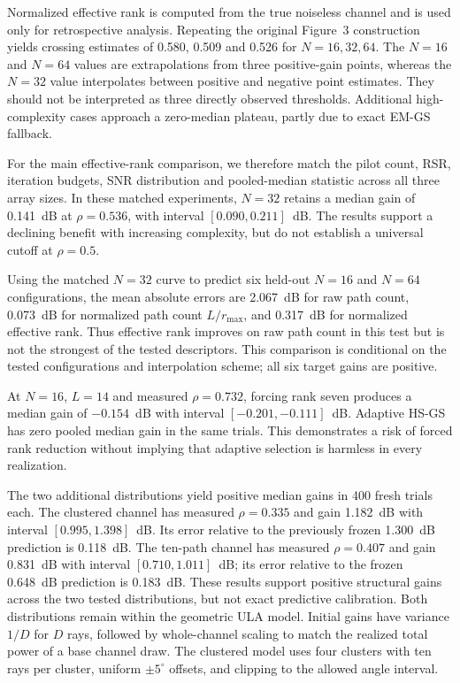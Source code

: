 Normalized effective rank is computed from the true noiseless channel and
is used only for retrospective analysis. Repeating the original Figure~3
construction yields crossing estimates of 0.580, 0.509 and 0.526 for
$N=16,32,64$. The $N=16$ and $N=64$ values are extrapolations from three
positive-gain points, whereas the $N=32$ value interpolates between
positive and negative point estimates. They should not be interpreted as
three directly observed thresholds. Additional high-complexity cases
approach a zero-median plateau, partly due to exact EM-GS fallback.

For the main effective-rank comparison, we therefore match the pilot count,
RSR, iteration budgets, SNR distribution and pooled-median statistic across
all three array sizes. In these matched experiments, $N=32$ retains a
median gain of 0.141~dB at $\rho=0.536$, with interval $[0.090,0.211]$~dB.
The results support a declining benefit with increasing complexity, but
do not establish a universal cutoff at $\rho=0.5$.

Using the matched $N=32$ curve to predict six held-out $N=16$ and $N=64$
configurations, the mean absolute errors are 2.067~dB for raw path count,
0.073~dB for normalized path count $L/r_{\max}$, and 0.317~dB for
normalized effective rank. Thus effective rank improves on raw path count
in this test but is not the strongest of the tested descriptors. This
comparison is conditional on the tested configurations and interpolation
scheme; all six target gains are positive.

At $N=16$, $L=14$ and measured $\rho=0.732$, forcing rank seven produces
a median gain of $-0.154$~dB with interval $[-0.201,-0.111]$~dB.
Adaptive HS-GS has zero pooled median gain in the same trials. This
demonstrates a risk of forced rank reduction without implying that
adaptive selection is harmless in every realization.

The two additional distributions yield positive median gains in 400 fresh
trials each. The clustered channel has measured $\rho=0.335$ and gain
1.182~dB with interval $[0.995,1.398]$~dB. Its error relative to the
previously frozen 1.300~dB prediction is 0.118~dB. The ten-path channel
has measured $\rho=0.407$ and gain 0.831~dB with interval
$[0.710,1.011]$~dB; its error relative to the frozen 0.648~dB prediction
is 0.183~dB. These results support positive structural gains across the
two tested distributions, but not exact predictive calibration. Both
distributions remain within the geometric ULA model. Initial gains have
variance $1/D$ for $D$ rays, followed by whole-channel scaling to match
the realized total power of a base channel draw. The clustered model uses
four clusters with ten rays per cluster, uniform $\pm5^\circ$ offsets,
and clipping to the allowed angle interval.


